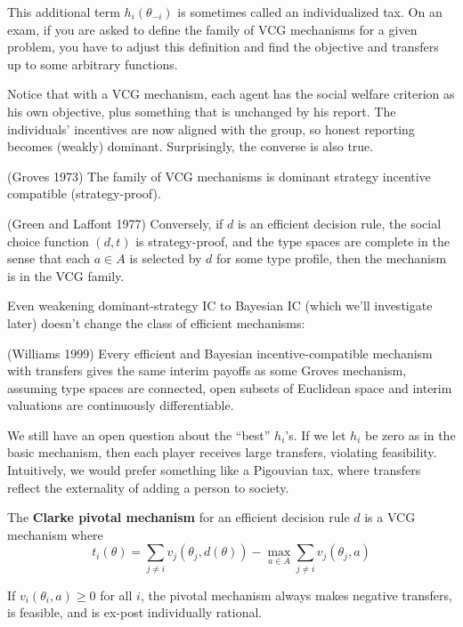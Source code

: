 \documentclass[10pt]{article}
\begin{document}
\begin{spacing}{1.0}
This additional term $h_i(\theta_{-i})$ is sometimes called an
individualized tax. On an exam, if you are asked to define the family of
VCG mechanisms for a given problem, you have to adjust this definition and
find the objective and transfers up to some arbitrary functions.

\hspace{1em} Notice that with a VCG mechanism, each agent has the social welfare
criterion as his own objective, plus something that is unchanged by his
report. The individuals' incentives are now aligned with the group, so
honest reporting becomes (weakly) dominant. Surprisingly, the converse is
also true.
\begin{theorem}
  (Groves 1973) The family of VCG mechanisms is dominant strategy incentive
  compatible (strategy-proof).
\end{theorem}
\begin{theorem}
  (Green and Laffont 1977) Conversely, if $d$ is an efficient decision
  rule, the social choice function $(d,t)$ is strategy-proof, and the type
  spaces are complete in the sense that each $a \in A$ is selected by $d$
  for some type profile, then the mechanism is in the VCG family.
\end{theorem}
Even weakening dominant-strategy IC to Bayesian IC (which we'll investigate
later) doesn't change the class of efficient mechanisms:
\begin{theorem}
  (Williams 1999) Every efficient and Bayesian incentive-compatible
  mechanism with transfers gives the same interim payoffs as some Groves
  mechanism, assuming type spaces are connected, open subsets of Euclidean
  space and interim valuations are continuously differentiable.
\end{theorem}

We still have an open question about the ``best'' $h_i$'s. If we let $h_i$
be zero as in the basic mechanism, then each player receives large
transfers, violating feasibility. Intuitively, we would prefer something
like a Pigouvian tax, where transfers reflect the externality of adding a
person to society.

\begin{definition}
  The \textbf{Clarke pivotal mechanism} for an efficient decision rule $d$
  is a VCG mechanism where \[t_i(\theta) = \sum_{j \neq i} v_j(\theta_j,
  d(\theta)) - \max_{a\in A} \sum_{j\neq i} v_j(\theta_j, a)\]
\end{definition}

\begin{theorem}
  If $v_i(\theta_i,a)\geq 0$ for all $i$, the pivotal mechanism always
  makes negative transfers, is feasible, and is ex-post individually
  rational.
\end{theorem}


\end{spacing}
\end{document}
